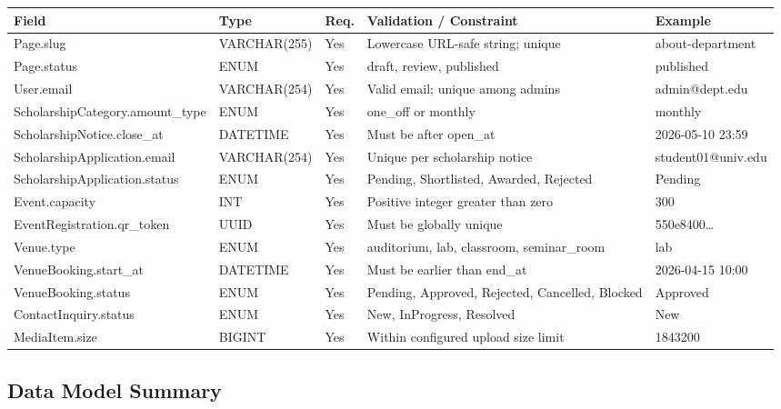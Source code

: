 \documentclass[12pt,a4paper]{article}
\newcommand{\thead}[1]{\textbf{\color{white}#1}}
\newcommand{\theadrow}{\rowcolor{headerblue}}
\begin{document}
\begin{longtable}{@{}L{3.2cm}L{2.8cm}C{0.8cm}L{3.4cm}L{3cm}@{}}
\theadrow \thead{Field} & \thead{Type} & \thead{Req.} & \thead{Validation / Constraint} & \thead{Example} \\
\endhead
Page.slug & VARCHAR(255) & Yes & Lowercase URL-safe string; unique & about-department \\
Page.status & ENUM & Yes & draft, review, published & published \\
User.email & VARCHAR(254) & Yes & Valid email; unique among admins & admin@dept.edu \\
Scholarship\-Category\newline .amount\_type & ENUM & Yes & one\_off or monthly & monthly \\
Scholarship\-Notice\newline .close\_at & DATETIME & Yes & Must be after open\_at & 2026-05-10 23:59 \\
Scholarship\-Application\newline .email & VARCHAR(254) & Yes & Unique per scholarship notice & student01@univ.edu \\
Scholarship\-Application\newline .status & ENUM & Yes & Pending, Shortlisted, Awarded, Rejected & Pending \\
Event.capacity & INT & Yes & Positive integer greater than zero & 300 \\
Event\-Registration\newline .qr\_token & UUID & Yes & Must be globally unique & 550e8400\ldots \\
Venue.type & ENUM & Yes & auditorium, lab, classroom, seminar\_room & lab \\
VenueBooking\newline .start\_at & DATETIME & Yes & Must be earlier than end\_at & 2026-04-15 10:00 \\
VenueBooking\newline .status & ENUM & Yes & Pending, Approved, Rejected, Cancelled, Blocked & Approved \\
ContactInquiry\newline .status & ENUM & Yes & New, InProgress, Resolved & New \\
MediaItem.size & BIGINT & Yes & Within configured upload size limit & 1843200 \\
\bottomrule
\end{longtable}

\subsection{Data Model Summary}
\end{document}
